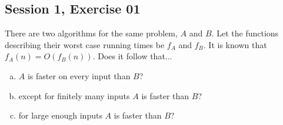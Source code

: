 \subsection{Session 1, Exercise 01}


There are two algorithms for the same problem, $A$ and $B$. Let the functions describing their worst case running times be $f_A$ and $f_B$. It is known that $f_A(n) = O(f_B(n))$. Does it follow that...

\begin{enumerate}[a.)]
\item $A$ is faster on every input than $B$?
\item except for finitely many inputs $A$ is faster than $B$?
\item for large enough inputs $A$ is faster than $B$?
\end{enumerate}


